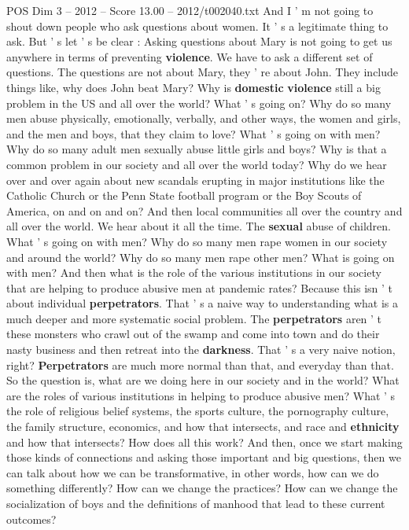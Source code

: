 \begin{textsample}{POS Dim 3 – 2012 – Score 13.00 – 2012/t002040.txt}
And I ' m not going to shout down people who ask questions about women.
It ' s a legitimate thing to ask.
But ' s let ' s be clear : Asking questions about Mary is not going to get us anywhere in terms of preventing \textbf{violence}.
We have to ask a different set of questions.
The questions are not about Mary, they ' re about John.
They include things like, why does John beat Mary?
Why is \textbf{domestic} \textbf{violence} still a big problem in the US and all over the world?
What ' s going on?
Why do so many men abuse physically, emotionally, verbally, and other ways, the women and girls, and the men and boys, that they claim to love?
What ' s going on with men?
Why do so many adult men sexually abuse little girls and boys?
Why is that a common problem in our society and all over the world today?
Why do we hear over and over again about new scandals erupting in major institutions like the Catholic Church or the Penn State football program or the Boy Scouts of America, on and on and on?
And then local communities all over the country and all over the world.
We hear about it all the time.
The \textbf{sexual} abuse of children.
What ' s going on with men?
Why do so many men rape women in our society and around the world?
Why do so many men rape other men?
What is going on with men?
And then what is the role of the various institutions in our society that are helping to produce abusive men at pandemic rates?
Because this isn ' t about individual \textbf{perpetrators}.
That ' s a naive way to understanding what is a much deeper and more systematic social problem.
The \textbf{perpetrators} aren ' t these monsters who crawl out of the swamp and come into town and do their nasty business and then retreat into the \textbf{darkness}.
That ' s a very naive notion, right? \textbf{Perpetrators} are much more normal than that, and everyday than that.
So the question is, what are we doing here in our society and in the world?
What are the roles of various institutions in helping to produce abusive men?
What ' s the role of religious belief systems, the sports culture, the pornography culture, the family structure, economics, and how that intersects, and race and \textbf{ethnicity} and how that intersects?
How does all this work?
And then, once we start making those kinds of connections and asking those important and big questions, then we can talk about how we can be transformative, in other words, how can we do something differently?
How can we change the practices?
How can we change the socialization of boys and the definitions of manhood that lead to these current outcomes?

\end{textsample}
